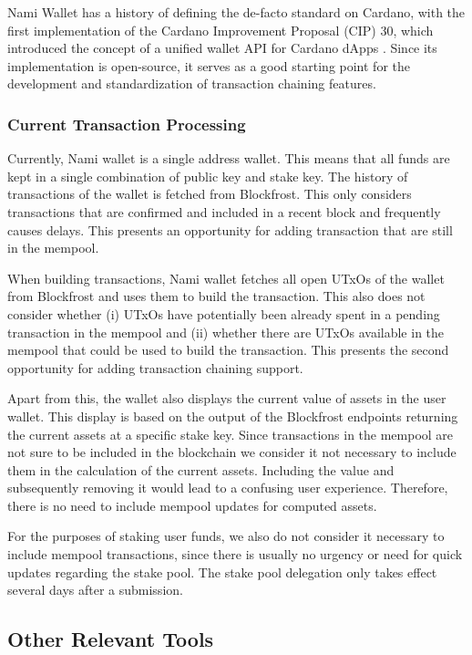 \documentclass[11pt]{article}
\begin{document}
Nami Wallet has a history of defining the de-facto standard on Cardano, with the first implementation of the Cardano Improvement Proposal (CIP) 30, which introduced the concept of a unified wallet API for Cardano dApps \cite{cip30}.
Since its implementation is open-source, it serves as a good starting point for the development and standardization of transaction chaining features.

\subsubsection{Current Transaction Processing}

Currently, Nami wallet is a single address wallet.
This means that all funds are kept in a single combination of public key and stake key.
The history of transactions of the wallet is fetched from Blockfrost.
This only considers transactions that are confirmed and included in a recent block and frequently causes delays.
This presents an opportunity for adding transaction that are still in the mempool.

When building transactions, Nami wallet fetches all open UTxOs of the wallet from Blockfrost
and uses them to build the transaction.
This also does not consider whether (i) UTxOs have potentially been already spent in a pending transaction in the mempool and
(ii) whether there are UTxOs available in the mempool that could be used to build the transaction.
This presents the second opportunity for adding transaction chaining support.

Apart from this, the wallet also displays the current value of assets in the user wallet.
This display is based on the output of the Blockfrost endpoints returning the current assets at a specific stake key.
Since transactions in the mempool are not sure to be included in the blockchain
we consider it not necessary to include them in the calculation of the current assets.
Including the value and subsequently removing it would lead to a confusing user experience.
Therefore, there is no need to include mempool updates for computed assets.

For the purposes of staking user funds, we also do not consider it necessary to include mempool transactions,
since there is usually no urgency or need for quick updates regarding the stake pool.
The stake pool delegation only takes effect several days after a submission.

\subsection{Other Relevant Tools}
\end{document}
